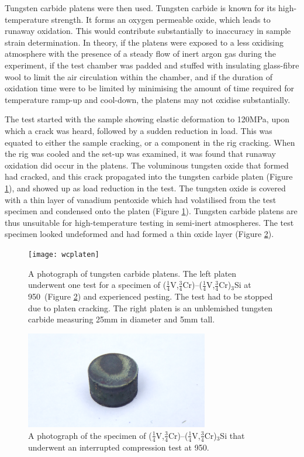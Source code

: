 Tungsten carbide platens were then used.  Tungsten carbide is known for its high-temperature strength.  It forms an oxygen permeable oxide, which leads to runaway oxidation.  This would contribute substantially to inaccuracy in sample strain determination.  In theory, if the platens were exposed to a less oxidising atmosphere with the presence of a steady flow of inert argon gas during the experiment, if the test chamber was padded and stuffed with insulating glass-fibre wool to limit the air circulation within the chamber, and if the duration of oxidation time were to be limited by minimising the amount of time required for temperature ramp-up and cool-down, the platens may not oxidise substantially.  

The test started with the sample showing elastic deformation to 120MPa, upon which a crack was heard, followed by a sudden reduction in load.  This was equated to either the sample cracking, or a component in the rig cracking.  When the rig was cooled and the set-up was examined, it was found that runaway oxidation did occur in the platens.  The voluminous tungsten oxide that formed had cracked, and this crack propagated into the tungsten carbide platen (Figure \ref{fig:wcplaten}), and showed up as load reduction in the test.  The tungsten oxide is covered with a thin layer of vanadium pentoxide which had volatilised from the test specimen and condensed onto the platen (Figure \ref{fig:wcplaten}).  Tungsten carbide platens are thus unsuitable for high-temperature testing in semi-inert atmospheres.  The test specimen looked undeformed and had formed a thin oxide layer (Figure \ref{fig:25V_lcf_950}).  

%
\begin{figure}[H]
\begin{center}
\texttt{[image: wcplaten]}
\caption{A photograph of tungsten carbide platens. The left platen underwent one test for a specimen of ($\frac{1}{4}$V,$\frac{3}{4}$Cr)--($\frac{1}{4}$V,$\frac{3}{4}$Cr)$_3$Si at 950\celsius\ (Figure \ref{fig:25V_lcf_950}) and experienced pesting.  The test had to be stopped due to platen cracking.  The right platen is an unblemished tungsten carbide measuring 25mm in diameter and 5mm tall.}
\label{fig:wcplaten}
\end{center}
\end{figure}
%

%
\begin{figure}[H]
\begin{center}
\includegraphics[width=8cm]{25V_lcf}
\caption{A photograph of the specimen of ($\frac{1}{4}$V,$\frac{3}{4}$Cr)--($\frac{1}{4}$V,$\frac{3}{4}$Cr)$_3$Si that underwent an interrupted compression test at 950\celsius. }
\label{fig:25V_lcf_950}
\end{center}
\end{figure}
%

